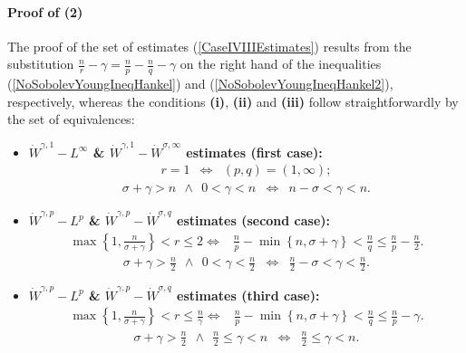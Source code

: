 \documentclass{amsart}
\theoremstyle{definition}
\theoremstyle{remark}
\numberwithin{equation}{section}
\begin{document}
{			\paragraph{\bf Proof of  (2)}
			The proof of the set of estimates (\ref{CaseIVIIIEstimates}) results from the substitution $\displaystyle \frac{n}{r}-\gamma=\frac{n}{p}-\frac{n}{q}-\gamma$ on the right hand of the inequalities (\ref{NoSobolevYoungIneqHankel}) and (\ref{NoSobolevYoungIneqHankel2}), respectively, whereas the conditions {\bf (i)}, {\bf (ii)} and {\bf (iii)} follow straightforwardly by the set of equivalences:
			\begin{itemize}
				\item[\bf (i)] {\bf $\dot{W}^{\gamma,1}-L^\infty$ \& $\dot{W}^{\gamma,1}-\dot{W}^{\sigma,\infty}$ estimates (first case):} 
				\begin{eqnarray*}
					r=1 &\Longleftrightarrow&(p,q)=(1,\infty);
				\end{eqnarray*}
				\begin{eqnarray*}
					\sigma+\gamma>n~~\wedge~~0<\gamma<n&\Longleftrightarrow&  n-\sigma<\gamma<n.
				\end{eqnarray*}
				\item[\bf (ii)] {\bf $\dot{W}^{\gamma,p}-L^p$ \& $\dot{W}^{\gamma,p}-\dot{W}^{\sigma,q}$ estimates (second case):} 
				\begin{eqnarray*}			
					\max\left\{1,\frac{n}{\sigma+\gamma}\right\}< r\leq 2 \Longleftrightarrow & \displaystyle \frac{n}{p}-{\min\left\{n,\sigma+\gamma\right\}}\displaystyle  < \frac{n}{q} \leq \frac{n}{p}-\frac{n}{2}.
				\end{eqnarray*}
				\begin{eqnarray*}
					\sigma+\gamma>\frac{n}{2}~~\wedge~~0<\gamma<\frac{n}{2}&\Longleftrightarrow&  \frac{n}{2}-\sigma<\gamma<\frac{n}{2}.
				\end{eqnarray*}
				
				\item[\bf (iii)] {\bf $\dot{W}^{\gamma,p}-L^p$ \& $\dot{W}^{\gamma,p}-\dot{W}^{\sigma,q}$ estimates (third case):} 
				\begin{eqnarray*}
					\max\left\{1,\frac{n}{\sigma+\gamma}\right\}< r\leq\frac{n}{\gamma} \Longleftrightarrow &\displaystyle \frac{n}{p}-{\min\left\{n,{\sigma+\gamma}\right\}}\displaystyle  < \frac{n}{q} \leq \frac{n}{p}-\gamma.
				\end{eqnarray*}
				\begin{eqnarray*}
					\sigma+\gamma>\frac{n}{2}~~\wedge~~\frac{n}{2}\leq\gamma<n&\Longleftrightarrow&  \frac{n}{2}\leq\gamma<n.
				\end{eqnarray*}
			\end{itemize}

}
\end{document}
